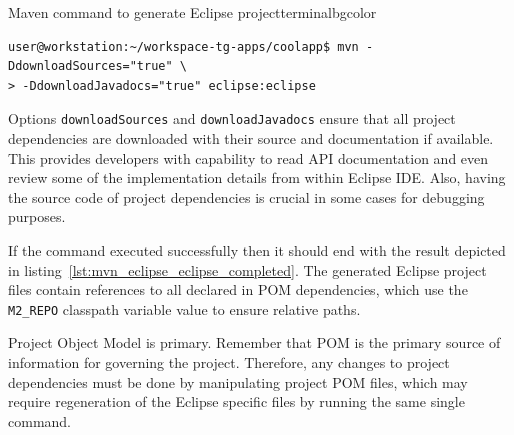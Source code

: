   \begin{code}{Maven command to generate Eclipse project}{\label{lst:gen_eclipse}}{terminalbgcolor}
     \begin{lstlisting}
user@workstation:~/workspace-tg-apps/coolapp$ mvn -DdownloadSources="true" \
> -DdownloadJavadocs="true" eclipse:eclipse
     \end{lstlisting}
  \end{code}
    
  Options \texttt{downloadSources} and \texttt{downloadJavadocs} ensure that all project dependencies are downloaded with their source and documentation if available.
  This provides developers with capability to read API documentation and even review some of the implementation details from within Eclipse IDE.
  Also, having the source code of project dependencies is crucial in some cases for debugging purposes.

  If the command executed successfully then it should end with the result depicted in listing~\ref{lst:mvn_eclipse_eclipse_completed}. 
  The generated Eclipse project files contain references to all declared in POM dependencies, which use the \texttt{M2\_REPO} classpath variable value to ensure relative paths.

  \begin{notebox}{Project Object Model is primary.}{\label{mb:maven_primary}}
    Remember that POM is the primary source of information for governing the project.
    Therefore, any changes to project dependencies must be done by manipulating project POM files, which may require regeneration of the Eclipse specific files by running the same single command.
  \end{notebox}
  
